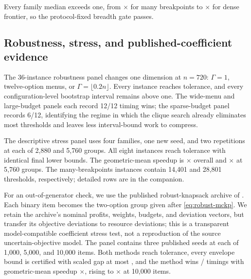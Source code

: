 \documentclass[11pt]{article}
\theoremstyle{plain}
\theoremstyle{definition}
\theoremstyle{remark}
\begin{document}
Every family median exceeds one, from \PubFamilyBreakpoints$\times$ for many breakpoints to \PubFamilyDense$\times$ for dense frontier, so the protocol-fixed breadth gate passes.

\subsection{Robustness, stress, and published-coefficient evidence}

The 36-instance robustness panel changes one dimension at $n=720$: $\Gamma=1$, twelve-option menus, or $\Gamma=\lfloor0.2n\rfloor$.  Every instance reaches tolerance, and every configuration-level bootstrap interval remains above one.  The wide-menu and large-budget panels each record 12/12 timing wins; the sparse-budget panel records 6/12, identifying the regime in which the clique search already eliminates most thresholds and leaves less interval-bound work to compress.

\begin{table}[t]
\centering
\caption{Robustness configurations at 720 groups, four families, and three new seeds.  Within each configuration, bootstrap intervals resample the three seeds separately by family.}
\label{tab:robustness}
\small
\resizebox{\textwidth}{!}{}
\end{table}

The descriptive stress panel uses four families, one new seed, and two repetitions at each of 2,880 and 5,760 groups.  All eight instances reach tolerance with identical final lower bounds.  The geometric-mean speedup is \PubStressGeoSpeedup$\times$ overall and \PubStressNHighSpeedup$\times$ at 5,760 groups.  The many-breakpoints instances contain 14,401 and 28,801 thresholds, respectively; detailed rows are in the companion.

For an out-of-generator check, we use the published robust-knapsack archive of \citet{GersingData2022}.  Each binary item becomes the two-option group given after \eqref{eq:robust-mckp}.  We retain the archive's nominal profits, weights, budgets, and deviation vectors, but transfer its objective deviations to resource deviations; this is a transparent model-compatible coefficient stress test, not a reproduction of the source uncertain-objective model.  The panel contains three published seeds at each of 1,000, 5,000, and 10,000 items.  Both methods reach tolerance, every envelope bound is certified with scaled gap at most \PubExternalCertGap, and the method wins \PubExternalWins{}/\PubExternalCases{} timings with geometric-mean speedup \PubExternalGeoSpeedup$\times$, rising to \PubExternalNHighSpeedup$\times$ at 10,000 items.
\end{document}

